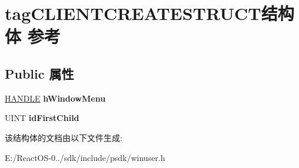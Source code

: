 \hypertarget{structtag_c_l_i_e_n_t_c_r_e_a_t_e_s_t_r_u_c_t}{}\section{tag\+C\+L\+I\+E\+N\+T\+C\+R\+E\+A\+T\+E\+S\+T\+R\+U\+C\+T结构体 参考}
\label{structtag_c_l_i_e_n_t_c_r_e_a_t_e_s_t_r_u_c_t}
\subsection*{Public 属性}
\begin{DoxyCompactItemize}
\item 
\mbox{\label{structtag_c_l_i_e_n_t_c_r_e_a_t_e_s_t_r_u_c_t_a6887ccb83ffab01045a740b492a8578a}} 
\hyperlink{interfacevoid}{H\+A\+N\+D\+LE} {\bfseries h\+Window\+Menu}
\item 
\mbox{\label{structtag_c_l_i_e_n_t_c_r_e_a_t_e_s_t_r_u_c_t_ac369aab6b723b4fc265751c53c5cf6f7}} 
U\+I\+NT {\bfseries id\+First\+Child}
\end{DoxyCompactItemize}


该结构体的文档由以下文件生成\+:\begin{DoxyCompactItemize}
\item 
E\+:/\+React\+O\+S-\/0../sdk/include/psdk/winuser.\+h\end{DoxyCompactItemize}
